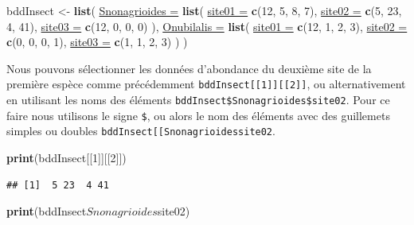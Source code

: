 \documentclass[twoside,symmetric]{book}
\newenvironment{Shaded}{}{}
\newcommand{\DataTypeTok}[1]{\underline{#1}}
\newcommand{\DecValTok}[1]{#1}
\newcommand{\KeywordTok}[1]{\textbf{#1}}
\newcommand{\NormalTok}[1]{#1}
\newcommand{\OperatorTok}[1]{#1}
\newcommand{\StringTok}[1]{#1}
\begin{document}
\begin{Shaded}
\begin{Highlighting}[]
\NormalTok{bddInsect <-}\StringTok{ }\KeywordTok{list}\NormalTok{(}
  \DataTypeTok{Snonagrioides =} \KeywordTok{list}\NormalTok{(}
    \DataTypeTok{site01 =} \KeywordTok{c}\NormalTok{(}\DecValTok{12}\NormalTok{, }\DecValTok{5}\NormalTok{, }\DecValTok{8}\NormalTok{, }\DecValTok{7}\NormalTok{), }
    \DataTypeTok{site02 =} \KeywordTok{c}\NormalTok{(}\DecValTok{5}\NormalTok{, }\DecValTok{23}\NormalTok{, }\DecValTok{4}\NormalTok{, }\DecValTok{41}\NormalTok{), }
    \DataTypeTok{site03 =} \KeywordTok{c}\NormalTok{(}\DecValTok{12}\NormalTok{, }\DecValTok{0}\NormalTok{, }\DecValTok{0}\NormalTok{, }\DecValTok{0}\NormalTok{)}
\NormalTok{  ), }
  \DataTypeTok{Onubilalis =} \KeywordTok{list}\NormalTok{(}
    \DataTypeTok{site01 =} \KeywordTok{c}\NormalTok{(}\DecValTok{12}\NormalTok{, }\DecValTok{1}\NormalTok{, }\DecValTok{2}\NormalTok{, }\DecValTok{3}\NormalTok{), }
    \DataTypeTok{site02 =} \KeywordTok{c}\NormalTok{(}\DecValTok{0}\NormalTok{, }\DecValTok{0}\NormalTok{, }\DecValTok{0}\NormalTok{, }\DecValTok{1}\NormalTok{), }
    \DataTypeTok{site03 =} \KeywordTok{c}\NormalTok{(}\DecValTok{1}\NormalTok{, }\DecValTok{1}\NormalTok{, }\DecValTok{2}\NormalTok{, }\DecValTok{3}\NormalTok{)}
\NormalTok{  )}
\NormalTok{)}
\end{Highlighting}
\end{Shaded}

Nous pouvons sélectionner les données d'abondance du deuxième site de la première espèce comme précédemment \texttt{bddInsect{[}{[}1{]}{]}{[}{[}2{]}{]}}, ou alternativement en utilisant les noms des éléments \texttt{bddInsect\$Snonagrioides\$site02}. Pour ce faire nous utilisons le signe \texttt{\$}, ou alors le nom des éléments avec des guillemets simples ou doubles \texttt{bddInsect{[}{[}\textquotesingle{}Snonagrioides\textquotesingle{}{]}{]}{[}{[}\textquotesingle{}site02\textquotesingle{}{]}{]}}.

\begin{Shaded}
\begin{Highlighting}[]
\KeywordTok{print}\NormalTok{(bddInsect[[}\DecValTok{1}\NormalTok{]][[}\DecValTok{2}\NormalTok{]])}
\end{Highlighting}
\end{Shaded}

\begin{verbatim}
## [1]  5 23  4 41
\end{verbatim}

\begin{Shaded}
\begin{Highlighting}[]
\KeywordTok{print}\NormalTok{(bddInsect}\OperatorTok{$}\NormalTok{Snonagrioides}\OperatorTok{$}\NormalTok{site02)}
\end{Highlighting}
\end{Shaded}
\end{document}
